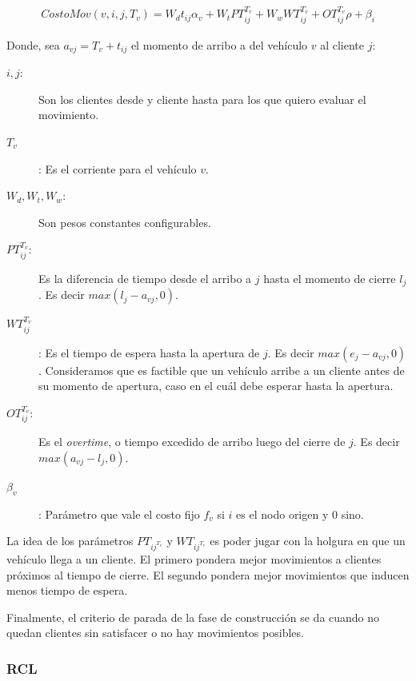 \documentclass{article}
\begin{document}
  \begin{align}
    CostoMov(v, i, j, T_v) = W_d t_{ij} \alpha_v + W_t PT_{ij}^{T_v} + W_w WT_{ij}^{T_v} + OT_{ij}^{T_v} \rho + \beta_i
    \label{eq:rclmovecost}
  \end{align}
  
  Donde, sea $a_{vj} = T_v + t_{ij}$ el momento de arribo a del vehículo $v$ al cliente $j$:
  \begin{description}
    \item[$i, j$:] Son los clientes desde y cliente hasta para los que quiero evaluar el movimiento.
    \item[$T_v$]: Es el corriente para el vehículo $v$.
    \item[$W_d, W_t, W_w$:] Son pesos constantes configurables.
    \item[$PT_{ij}^{T_v}$:] Es la diferencia de tiempo desde el arribo a $j$ hasta el momento de cierre $l_j$. Es decir $max(l_j - a_{vj}, 0)$.
    \item[$WT_{ij}^{T_v}$]: Es el tiempo de espera hasta la apertura de $j$. Es decir $max(e_j - a_{vj}, 0)$. Consideramos que es factible que un vehículo arribe a un cliente antes de su momento de apertura, caso en el cuál debe esperar hasta la apertura.
    \item[$OT_{ij}^{T_v}$:] Es el {\it overtime}, o tiempo excedido de arribo luego del cierre de $j$. Es decir $max(a_{vj} - l_j, 0)$.
    \item[$\beta_v$]: Parámetro que vale el costo fijo $f_v$ si $i$ es el nodo origen y $0$ sino.
  \end{description}

  La idea de los parámetros $PT_{ij^{T_v}}$ y $WT_{ij^{T_v}}$ es poder jugar con la holgura en que un vehículo llega a un cliente. El primero pondera mejor movimientos a clientes próximos al tiempo de cierre. El segundo pondera mejor movimientos que inducen menos tiempo de espera.

  Finalmente, el criterio de parada de la fase de construcción se da cuando no quedan clientes sin satisfacer o no hay movimientos posibles.

  \subsubsection*{RCL}
\end{document}
